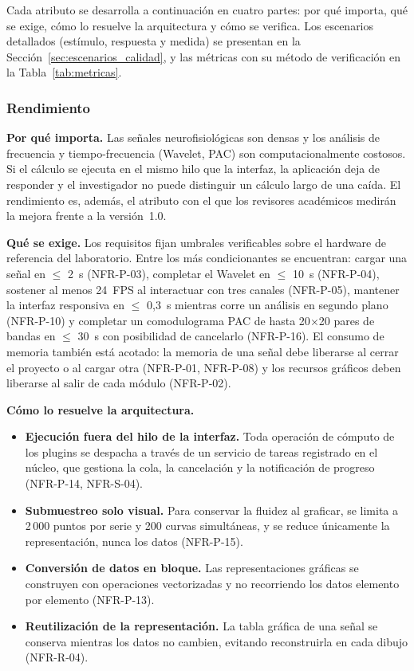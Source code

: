 \documentclass[11pt,a4paper]{article}
\DeclareRobustCommand{\_}{\textunderscore\allowbreak}
\begin{document}
Cada atributo se desarrolla a continuación en cuatro partes: por qué importa, qué se exige, cómo lo resuelve la arquitectura y cómo se verifica. Los escenarios detallados (estímulo, respuesta y medida) se presentan en la Sección~\ref{sec:escenarios_calidad}, y las métricas con su método de verificación en la Tabla~\ref{tab:metricas}.

\subsubsection{Rendimiento}

\textbf{Por qué importa.} Las señales neurofisiológicas son densas y los análisis de frecuencia y tiempo-frecuencia (Wavelet, PAC) son computacionalmente costosos. Si el cálculo se ejecuta en el mismo hilo que la interfaz, la aplicación deja de responder y el investigador no puede distinguir un cálculo largo de una caída. El rendimiento es, además, el atributo con el que los revisores académicos medirán la mejora frente a la versión~1.0.

\textbf{Qué se exige.} Los requisitos fijan umbrales verificables sobre el hardware de referencia del laboratorio. Entre los más condicionantes se encuentran: cargar una señal en $\leq$ 2~s (NFR-P-03), completar el Wavelet en $\leq$ 10~s (NFR-P-04), sostener al menos 24~FPS al interactuar con tres canales (NFR-P-05), mantener la interfaz responsiva en $\leq$ 0,3~s mientras corre un análisis en segundo plano (NFR-P-10) y completar un comodulograma PAC de hasta 20$\times$20 pares de bandas en $\leq$ 30~s con posibilidad de cancelarlo (NFR-P-16). El consumo de memoria también está acotado: la memoria de una señal debe liberarse al cerrar el proyecto o al cargar otra (NFR-P-01, NFR-P-08) y los recursos gráficos deben liberarse al salir de cada módulo (NFR-P-02).

\textbf{Cómo lo resuelve la arquitectura.}
\begin{itemize}[nosep]
    \item \textbf{Ejecución fuera del hilo de la interfaz.} Toda operación de cómputo de los plugins se despacha a través de un servicio de tareas registrado en el núcleo, que gestiona la cola, la cancelación y la notificación de progreso (NFR-P-14, NFR-S-04).
    \item \textbf{Submuestreo solo visual.} Para conservar la fluidez al graficar, se limita a 2\,000 puntos por serie y 200 curvas simultáneas, y se reduce únicamente la representación, nunca los datos (NFR-P-15).
    \item \textbf{Conversión de datos en bloque.} Las representaciones gráficas se construyen con operaciones vectorizadas y no recorriendo los datos elemento por elemento (NFR-P-13).
    \item \textbf{Reutilización de la representación.} La tabla gráfica de una señal se conserva mientras los datos no cambien, evitando reconstruirla en cada dibujo (NFR-R-04).
\end{itemize}
\end{document}

